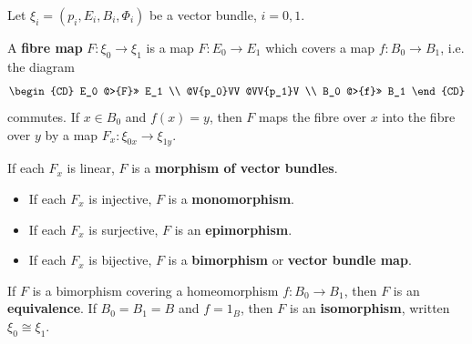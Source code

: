 Let $\xi_i = (p_i, E_i, B_i, \Phi_i)$ be a vector bundle, $i = 0, 1$.

A \textbf{fibre map} $F: \xi_0 \to \xi_1$ is a map $F: E_0 \to E_1$ which covers a map $f: B_0 \to B_1$, i.e. the diagram
\[
\begin{CD}
E_0 @>{F}>> E_1 \\
@V{p_0}VV @VV{p_1}V \\
B_0 @>{f}>> B_1
\end{CD}
\]
commutes. If $x \in B_0$ and $f(x) = y$, then $F$ maps the fibre over $x$ into the fibre over $y$ by a map $F_x: \xi_{0x} \to \xi_{1y}$.

If each $F_x$ is linear, $F$ is a \textbf{morphism of vector bundles}.
\begin{itemize}
\item If each $F_x$ is injective, $F$ is a \textbf{monomorphism}.
\item If each $F_x$ is surjective, $F$ is an \textbf{epimorphism}.
\item If each $F_x$ is bijective, $F$ is a \textbf{bimorphism} or \textbf{vector bundle map}.
\end{itemize}

If $F$ is a bimorphism covering a homeomorphism $f: B_0 \to B_1$, then $F$ is an \textbf{equivalence}. If $B_0 = B_1 = B$ and $f = 1_B$, then $F$ is an \textbf{isomorphism}, written $\xi_0 \cong \xi_1$.

